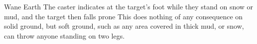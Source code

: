   {}%
  {Wane}%
  {Earth}%
  {}%
  {The caster indicates at the target's foot while they stand on snow or mud, and the target then falls prone}%
  {
    This does nothing of any consequence on solid ground, but soft ground, such as any area covered in thick mud, or snow, can throw anyone standing on two legs.}


